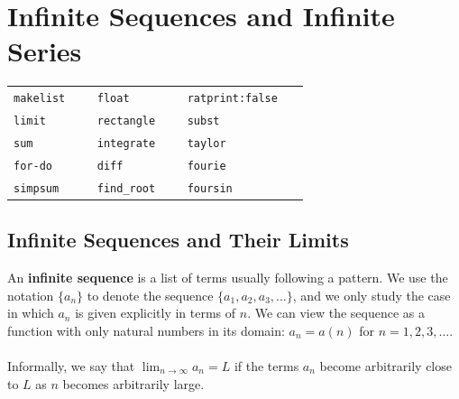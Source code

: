 \documentclass[10.5pt,twoside]{report}
\theoremstyle{definition}
\begin{document}
\pagebreak



\chapter{Infinite Sequences and Infinite Series}

\vspace*{\fill}

\minitoc

\vspace*{\fill}


\newline
\newline

\begin{tabular}{l l l}
 \verb|makelist   |   &\verb|float   |   &\verb|ratprint:false   |   \\
 \verb|limit   |   &\verb|rectangle   |   &\verb|subst   |   \\
 \verb|sum   |   &\verb|integrate   |   &\verb|taylor   |   \\
 \verb|for-do   |   &\verb|diff   |   &\verb|fourie   |   \\
 \verb|simpsum   |   &\verb|find_root   |   &\verb|foursin   |   \\
\end{tabular}



\pagebreak
\section{Infinite Sequences and Their Limits}\label{Infinite Sequences and Their Limits}

An \textbf{infinite sequence} is a list of terms usually following a pattern.  We use the notation $\lbrace a_n \rbrace $ to denote the sequence $\lbrace a_1,a_2,a_3,\dots \rbrace$, and we only study the case in which $a_n$ is given explicitly in terms of $n$.  We can view the sequence as a function with only natural numbers in its domain:  $a_n=a(n)$ for $n=1,2,3,\dots $.\\
${}$\\
Informally, we say that $\lim_{n\to \infty} a_n = L$ if the terms $a_n$ become arbitrarily close to $L$ as $n$ becomes arbitrarily large.\\
${}$\\
\end{document}
